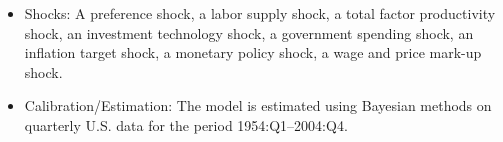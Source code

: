 \documentclass[11pt,a4paper]{article}
\begin{document}
\begin{itemize}
		\item Shocks: A preference shock, a labor supply shock, a total factor productivity shock, an investment technology shock, a government spending shock, an inflation target shock, a monetary policy shock, a wage and price mark-up shock.
		
		\item Calibration/Estimation: The model is estimated using Bayesian methods on quarterly U.S. data for the period 1954:Q1--2004:Q4.
		
	\end{itemize}
	
	
	
\end{document}
